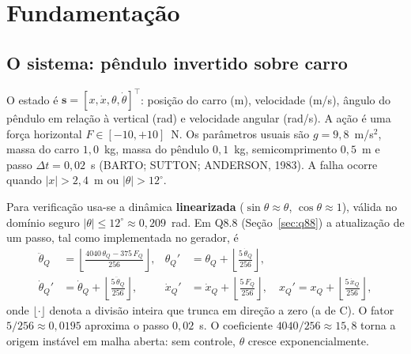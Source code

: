 \documentclass[12pt,openright,oneside,a4paper,chapter=TITLE,sumario=tradicional,english,brazil]{abntex2}
\begin{document}
\chapter{Fundamentação}\label{cap:fund}

\section{O sistema: pêndulo invertido sobre carro}

O estado é $\mathbf{s}=[x,\dot x,\theta,\dot\theta]^\top$: posição do carro (m), velocidade (m/s), ângulo do pêndulo em relação à vertical (rad) e velocidade angular (rad/s). A ação é uma força horizontal $F\in[-10,+10]$~N. Os parâmetros usuais são $g=9{,}8$~m/s$^2$, massa do carro $1{,}0$~kg, massa do pêndulo $0{,}1$~kg, semicomprimento $0{,}5$~m e passo $\Delta t=0{,}02$~s (BARTO; SUTTON; ANDERSON, 1983). A falha ocorre quando $|x|>2{,}4$~m ou $|\theta|>12^\circ$.

Para verificação usa-se a dinâmica \textbf{linearizada} ($\sin\theta\approx\theta$, $\cos\theta\approx 1$), válida no domínio seguro $|\theta|\le 12^\circ\approx0{,}209$~rad. Em Q8.8 (Seção~\ref{sec:q88}) a atualização de um passo, tal como implementada no gerador, é
\begin{align}
  \ddot\theta_Q &= \left\lfloor\frac{4040\,\theta_Q - 375\,F_Q}{256}\right\rfloor, &
  \theta_Q' &= \theta_Q + \left\lfloor\frac{5\,\dot\theta_Q}{256}\right\rfloor, \label{eq:din1}\\
  \dot\theta_Q' &= \dot\theta_Q + \left\lfloor\frac{5\,\ddot\theta_Q}{256}\right\rfloor, &
  \dot x_Q' &= \dot x_Q + \left\lfloor\frac{5\,F_Q}{256}\right\rfloor, \quad x_Q' = x_Q + \left\lfloor\frac{5\,\dot x_Q}{256}\right\rfloor, \label{eq:din2}
\end{align}
onde $\lfloor\cdot\rfloor$ denota a divisão inteira que trunca em direção a zero (a de C). O fator $5/256\approx0{,}0195$ aproxima o passo $0{,}02$~s. O coeficiente $4040/256\approx15{,}8$ torna a origem instável em malha aberta: sem controle, $\theta$ cresce exponencialmente.
\end{document}
